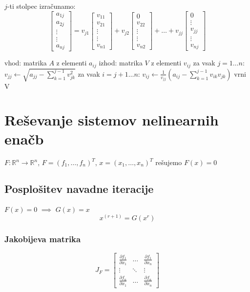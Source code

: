 \begin{multicols}{5}
$j$-ti stolpec izračunamo:
\[
	\begin{bmatrix}
		a_{1j} \\ a_{2j} \\ \vdots \\ \vdots \\ a_{nj}
	\end{bmatrix}
	=
	v_{j1} \begin{bmatrix}
		v_{11} \\ v_{21} \\ \vdots \\ \vdots \\ v_{n1}
	\end{bmatrix}
	+
	v_{j2} \begin{bmatrix}
		0 \\ v_{22} \\ \vdots \\ \vdots \\ v_{n2}
	\end{bmatrix}
	+ \dots +
	v_{jj} \begin{bmatrix}
		0 \\ \vdots \\ v_{jj} \\ \vdots \\ v_{nj}
	\end{bmatrix}
\]

\begin{koda}
vhod: matrika $A$ z elementi $a_{ij}$
izhod: matrika $V$ z elementi $v_{ij}$
za vsak $j = 1 \dots n$:
	$v_{jj} \leftarrow \sqrt{a_{jj}-\sum\limits_{k=1}^{j-1} v_{jk}^2}$
	za vsak $i = j+1 \dots n$:
		$v_{ij} \leftarrow \frac{1}{v_{jj}} \left( a_{ij} - \sum\limits_{k=1}^{j-1} v_{ik} v_{jk} \right)$
vrni V
\end{koda}

\section{Reševanje sistemov nelinearnih enačb}
$F: \mathbb{R}^n \to \mathbb{R}^n$, $F = (f_1, \dots, f_n)^T$, $x = (x_1, \dots, x_n)^T$ rešujemo $F(x) = 0$

\subsection{Posplošitev navadne iteracije}
$F(x) = 0$ $\implies$ $G(x) = x$
\[ x^{(r+1)} = G(x^{r})\]

\subsubsection{Jakobijeva matrika}
\[
	J_F = \begin{bmatrix}
		\frac{\partial f_1}{\partial x_1} & \dots & \frac{\partial f_1}{\partial x_n} \\
		\vdots & \ddots & \vdots \\
		\frac{\partial f_n}{\partial x_1} & \dots & \frac{\partial f_n}{\partial x_n}
	\end{bmatrix}
\]


\end{multicols}
